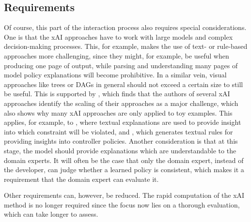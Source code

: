 \documentclass[twoside,11pt]{article}
\begin{document}
\subsection{Requirements}
Of course, this part of the interaction process also requires special considerations. One is that the xAI approaches have to work with large models and complex decision-making processes. This, for example, makes the use of text- or rule-based approaches more challenging, since they might, for example, be useful when producing one page of output, while parsing and understanding many pages of model policy explanations will become prohibitive. In a similar vein, visual approaches like trees or DAGs in general should not exceed a certain size to still be useful. 
This is supported by \citet{WellsBednarz:2021:xAIRLSurvey}, which finds that the authors of several xAI approaches identify the scaling of their approaches as a major challenge, which also shows why many xAI approaches are only applied to toy examples. This applies, for example, to \citet{TabrezHayes:2019:xRLTextualExplanations}, where textual explanations are used to provide insight into which constraint will be violated, and \citet{HayesShah:2017:AutonomousPolicyExplanation}, which generates textual rules for providing insights into controller policies.
Another consideration is that at this stage, the model should provide explanations which are understandable to the domain experts. It will often be the case that only the domain expert, instead of the developer, can judge whether a learned policy is consistent, which makes it a requirement that the domain expert can evaluate it.

Other requirements can, however, be reduced. The rapid computation of the xAI method is no longer required since the focus now lies on a thorough evaluation, which can take longer to assess.
\end{document}
